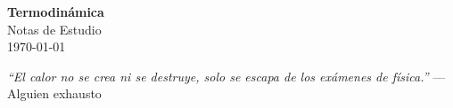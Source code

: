 \documentclass[12pt,a4paper]{scrbook}
\begin{document}
\begin{titlepage}
  \centering
  \vspace*{6cm}
  {\fontsize{36}{89}\selectfont\bfseries\color{white} Termodinámica}\\[2em]
  {\Large\color{white!90} Notas de Estudio}\\[2em]
  {\large\color{white!60} \today}
\end{titlepage}

\clearpage
\thispagestyle{empty}
\vspace*{2cm}
\begin{center}
\Large
\parbox{10cm}{
\begin{raggedright}
\textit{
“El calor no se crea ni se destruye, solo se escapa de los exámenes de física.”}
\vspace{.5cm}\hfill{--- Alguien exhausto}

\end{raggedright}}
\end{center}
\clearpage

\tableofcontents







\nocite{*}
\printbibliography
\end{document}
